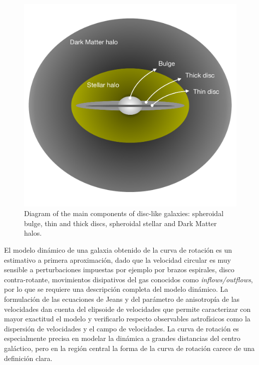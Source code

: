 \begin{figure}
  \centering
    \includegraphics[width=0.95\columnwidth]{Kap1/diagram_disk_galaxy.pdf}
  \caption{ Diagram of the main components of disc-like galaxies: spheroidal bulge, thin and thick discs, spheroidal stellar and Dark Matter halos.}
  \label{fig:Fig_diagram_galaxy}
\end{figure}

El modelo dinámico de una galaxia obtenido de la curva de rotación es un estimativo a primera aproximación, dado que la velocidad circular es muy sensible a perturbaciones impuestas por ejemplo por brazos espirales, disco contra-rotante, movimientos disipativos del gas conocidos como \emph{inflows/outflows}, por lo que se requiere una descripción completa del modelo dinámico. La formulación de las ecuaciones de Jeans y del parámetro de anisotropía de las velocidades dan cuenta del elipsoide de velocidades que permite caracterizar con mayor exactitud el modelo y verificarlo respecto observables astrofísicos como la dispersión de velocidades y el campo de velocidades. La curva de rotación es especialmente precisa en modelar la dinámica a grandes distancias del centro galáctico, pero en la región central la forma de la curva de rotación carece de una definición clara.\\







